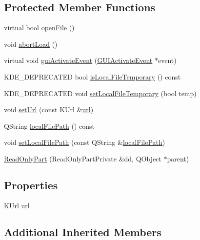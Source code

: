 \subsection*{Protected Member Functions}
\begin{DoxyCompactItemize}
\item 
virtual bool \hyperlink{classKParts_1_1ReadOnlyPart_a951a032497fb94b092dfd4fd134db09b}{open\+File} ()
\item 
void \hyperlink{classKParts_1_1ReadOnlyPart_abcfbcbb7ae52b89cbb4844405e8e9b6e}{abort\+Load} ()
\item 
virtual void \hyperlink{classKParts_1_1ReadOnlyPart_aa5ac9f161aef38a92bbf25891746cac0}{gui\+Activate\+Event} (\hyperlink{classKParts_1_1GUIActivateEvent}{G\+U\+I\+Activate\+Event} $\ast$event)
\item 
K\+D\+E\+\_\+\+D\+E\+P\+R\+E\+C\+A\+T\+E\+D bool \hyperlink{classKParts_1_1ReadOnlyPart_ace00a87565affbcdb3318a14d73969a6}{is\+Local\+File\+Temporary} () const 
\item 
K\+D\+E\+\_\+\+D\+E\+P\+R\+E\+C\+A\+T\+E\+D void \hyperlink{classKParts_1_1ReadOnlyPart_a68ab78486399e688ee5ebe9fda0cf35b}{set\+Local\+File\+Temporary} (bool temp)
\item 
void \hyperlink{classKParts_1_1ReadOnlyPart_a2d64650f22a8b72d8c56ddec21717df9}{set\+Url} (const K\+Url \&\hyperlink{classKParts_1_1ReadOnlyPart_a5b8edbf05a338814287496882adde559}{url})
\item 
Q\+String \hyperlink{classKParts_1_1ReadOnlyPart_a9c411f8471de1a852c8595719d179946}{local\+File\+Path} () const 
\item 
void \hyperlink{classKParts_1_1ReadOnlyPart_a25c155283ba9ad06eeb8b1b203e49789}{set\+Local\+File\+Path} (const Q\+String \&\hyperlink{classKParts_1_1ReadOnlyPart_a9c411f8471de1a852c8595719d179946}{local\+File\+Path})
\item 
\hyperlink{classKParts_1_1ReadOnlyPart_a08c76aee8709e9956d79266ba02791ff}{Read\+Only\+Part} (Read\+Only\+Part\+Private \&dd, Q\+Object $\ast$parent)
\end{DoxyCompactItemize}
\subsection*{Properties}
\begin{DoxyCompactItemize}
\item 
K\+Url \hyperlink{classKParts_1_1ReadOnlyPart_a5b8edbf05a338814287496882adde559}{url}
\end{DoxyCompactItemize}
\subsection*{Additional Inherited Members}


